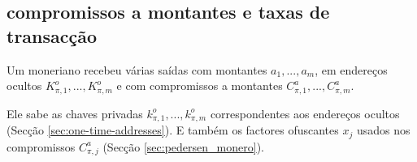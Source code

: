 

\subsection{compromissos a montantes e taxas de transacção}
\label{sec:commitments-and-fees}

Um moneriano recebeu várias saídas com montantes $a_1, ..., a_m$, em endereços ocultos $K^o_{\pi,1}, ..., K^o_{\pi,m}$
e com compromissos a montantes $C^a_{\pi,1}, ..., C^a_{\pi,m}$.

Ele sabe as chaves privadas $k^o_{\pi,1}, ..., k^o_{\pi,m}$ correspondentes aos endereços ocultos (Secção \ref{sec:one-time-addresses}). E também os factores ofuscantes $x_j$ usados nos compromissos $C^a_{\pi,j}$ (Secção \ref{sec:pedersen_monero}).


